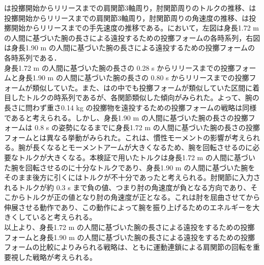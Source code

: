 は投擲開始からリリースまでの肩関節3軸周り，肘関節周りのトルクの推移、は投擲開始からリリースまでの肩関節3軸周り，肘関節周りの角速度の推移、は投擲開始からリリースまでの手先速度の推移である。において，左図は身長1.72 m の人間に基づいた腕の長さによる遠投するための投擲フォームの各時系列，右図は身長1.90 m の人間に基づいた腕の長さによる遠投するための投擲フォームの各時系列である．\\
身長1.72 m の人間に基づいた腕の長さの 0.28 s からリリースまでの投擲フォームと身長1.90 m の人間に基づいた腕の長さの 0.80 s からリリースまでの投擲フォームが類似していた。また、はの中でも投擲フォームが類似していた区間に着目したトルクの時系列であるが、各関節類似した傾向がみられた。よって、腕の長さに問わず重さ0.14 kg の投擲物を遠投するための投擲フォームの戦略は同様であると考えられる。しかし、身長1.90 m の人間に基づいた腕の長さの投擲フォームは 0.8 s の姿勢になるまでに身長1.72 m の人間に基づいた腕の長さの投擲フォームとは異なる挙動がみられた。これは、慣性モーメントの影響が考えられる。腕が長くなるとモーメントアームが大きくなるため、腕を回転させるのに必要なトルクが大きくなる。本検証で用いたトルクは身長1.72 m の人間に基づいた腕を回転させるのに十分なトルクであり、身長1.90 m の人間に基づいた腕をそのまま後方に引くにはトルクが不十分であったと考えられる。肘関節に入力されるトルクが約 0.3 s まで負の値、つまり肘の角速度が負となる方向であり、そこからトルクが正の値となり肘の角速度が正となる。これは肘を屈曲させてから伸展させる動作であり、この動作によって腕を振り上げるためのエネルギーを大きくしていると考えられる。\\
以上より、身長1.72 m の人間に基づいた腕の長さによる遠投をするための投擲フォームと身長1.90 m の人間に基づいた腕の長さによる遠投をするための投擲フォームの比較によりみられる戦略は、ともに運動連鎖による肩関節の回転を重要視した戦略が考えられる。

